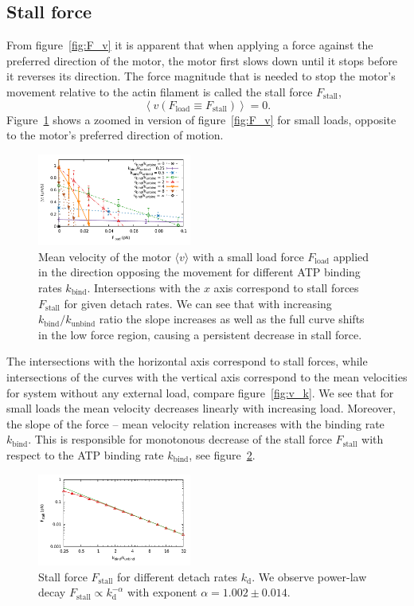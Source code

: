 \documentclass[aps,pre,twocolumn,showpacs,showkeys,superscriptaddress,floatfix]{revtex4-1}
\begin{document}
\subsection{Stall force}
From figure~\ref{fig:F_v} it is apparent that when applying a force against the preferred direction of the motor, 
the motor first slows down until it stops before it reverses its direction. 
The force magnitude that is needed to stop the motor's movement relative to the actin filament is called the stall force $F_\text{stall}$,  
\[
\left\langle v ( F_\text{load} \equiv F_\text{stall} ) \right\rangle = 0 .
\]
Figure~\ref{fig:F_v_zoom} shows a zoomed in version of figure~\ref{fig:F_v} for small loads, opposite to the motor's preferred direction of motion. 
\begin{figure}[t]
\centering
\includegraphics[width=0.45\textwidth,height=!]{F_v_zoom}
\caption{
\label{fig:F_v_zoom} 
Mean velocity of the motor $\langle v \rangle$ with a small load force $F_\text{load}$ applied in the direction opposing the movement for different ATP binding rates $k_\text{bind}$.
Intersections with the $x$ axis correspond to stall forces $F_\text{stall}$ for given detach rates. 
We can see that with increasing $k_\text{bind}/k_\text{unbind}$ ratio the slope increases as well as the full curve shifts in the low force region, causing a persistent decrease in stall force. 
}
\end{figure}
The intersections with the horizontal axis correspond to stall forces,  
while intersections of the curves with the vertical axis correspond to the mean velocities for system without any external load, compare figure~\ref{fig:v_k}. 
We see that for small loads the mean velocity decreases linearly with increasing load. 
Moreover, the slope of the force -- mean velocity relation increases with the binding rate $k_\text{bind}$. 
This is responsible for monotonous decrease of the stall force $F_\text{stall}$ with respect to the ATP binding rate $k_\text{bind}$, see figure~\ref{fig:k_Fstall}.
\begin{figure}[t]
\centering
\includegraphics[width=0.45\textwidth,height=!]{k_Fstall}
\caption{
\label{fig:k_Fstall} 
Stall force $F_\text{stall}$ for different detach rates $k_\text{d}$.
We observe power-law decay $F_\text{stall} \propto k_\text{d}^{-\alpha}$ with exponent $\alpha = 1.002 \pm 0.014$. 
}
\end{figure}
\end{document}
